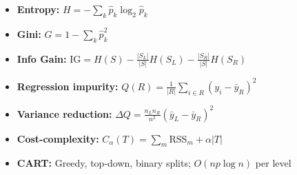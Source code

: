 \begin{keyformulas}[title=\textbf{Chapter 6 Summary}]
\begin{itemize}
    \item \textbf{Entropy:} $H = -\sum_k \hat{p}_k\log_2\hat{p}_k$
    \item \textbf{Gini:} $G = 1 - \sum_k \hat{p}_k^2$
    \item \textbf{Info Gain:} $\text{IG} = H(S) - \frac{|S_L|}{|S|}H(S_L) - \frac{|S_R|}{|S|}H(S_R)$
    \item \textbf{Regression impurity:} $Q(R) = \frac{1}{|R|}\sum_{i\in R}(y_i - \bar{y}_R)^2$
    \item \textbf{Variance reduction:} $\Delta Q = \frac{n_L n_R}{n^2}(\bar{y}_L - \bar{y}_R)^2$
    \item \textbf{Cost-complexity:} $C_\alpha(T) = \sum_m \text{RSS}_m + \alpha|T|$
    \item \textbf{CART:} Greedy, top-down, binary splits; $O(np\log n)$ per level
\end{itemize}
\end{keyformulas}
